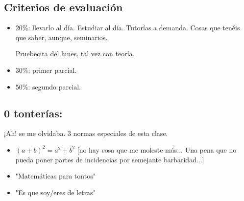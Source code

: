 \documentclass[palatino,nosec]{Docencia}
\begin{document}
\subsection{Criterios de evaluación}


\begin{itemize}
	\item 20\%: llevarlo al día.
	    \subitem Estudiar al día. Tutorías a demanda. Cosas que tenéis que saber, aunque, seminarios.

    	\subitem Pruebecita del lunes, tal vez con teoría.
	\item 30\%: primer parcial.
	\item 50\%: segundo parcial.
\end{itemize}

\subsection{0 tonterías:} ¡Ah! se me olvidaba. 3 normas especiales de esta clase.

\begin{itemize}
	\item $(a+b)^2 = a^2 + b^2$ [no hay cosa que me moleste más... Una pena que no pueda poner partes de incidencias por semejante barbaridad...]
	\item "Matemáticas para tontos"
	\item "Es que soy/eres de letras"
\end{itemize}







\printindex
\end{document}

